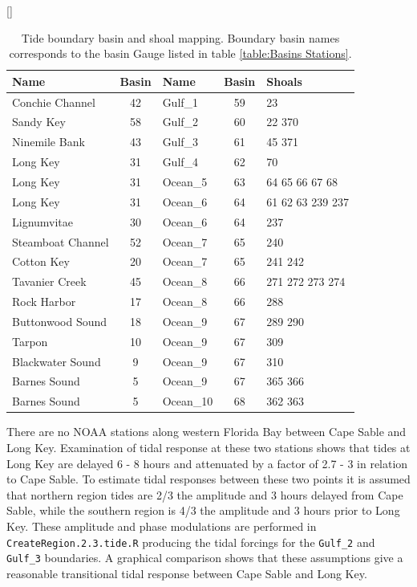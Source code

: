 \begin{table}[H]
  [\FBwidth]
  {
     \caption{ Tide boundary basin and shoal mapping. Boundary basin names 
               corresponds to the basin Gauge listed in 
               table \ref{table:Basins Stations}. }
     \label{table:Tide Basin Shoals}
  }
  {
    \centering
    \begin{tabular}{ l c l c l }
      \hline
      Name            & Basin & Name    & Basin & Shoals\\
      \hline
      Conchie Channel   &  42 & Gulf\_1   & 59 & 23\\
      Sandy Key         &  58 & Gulf\_2   & 60 & 22 370\\
      Ninemile Bank     &  43 & Gulf\_3   & 61 & 45 371\\
      Long Key          &  31 & Gulf\_4   & 62 & 70\\
      Long Key          &  31 & Ocean\_5  & 63 & 64 65 66 67 68\\
      Long Key          &  31 & Ocean\_6  & 64 & 61 62 63 239 237\\
      Lignumvitae       &  30 & Ocean\_6  & 64 & 237\\
      Steamboat Channel &  52 & Ocean\_7  & 65 & 240\\
      Cotton Key        &  20 & Ocean\_7  & 65 & 241 242\\
      Tavanier Creek    &  45 & Ocean\_8  & 66 & 271 272 273 274\\
      Rock Harbor       &  17 & Ocean\_8  & 66 & 288\\
      Buttonwood Sound  &  18 & Ocean\_9  & 67 & 289 290\\
      Tarpon            &  10 & Ocean\_9  & 67 & 309\\
      Blackwater Sound  &  9  & Ocean\_9  & 67 & 310\\
      Barnes Sound      &  5  & Ocean\_9  & 67 & 365 366\\
      Barnes Sound      &  5  & Ocean\_10 & 68 & 362 363\\
      \hline
    \end{tabular}
  }
\end{table}

There are no NOAA stations along western Florida Bay between Cape Sable and Long Key.  Examination of tidal response at these two stations shows that tides at Long Key are delayed 6 - 8 hours and attenuated by a factor of 2.7 - 3 in relation to Cape Sable.  To estimate tidal responses between these two points it is assumed that northern region tides are 2/3 the amplitude and 3 hours delayed from Cape Sable, while the southern region is 4/3 the amplitude and 3 hours prior to Long Key.  These amplitude and phase modulations are performed in \texttt{CreateRegion.2.3.tide.R} producing the tidal forcings for the \texttt{Gulf\_2} and \texttt{Gulf\_3} boundaries.  A graphical comparison shows that these assumptions give a reasonable transitional tidal response between Cape Sable and Long Key.

